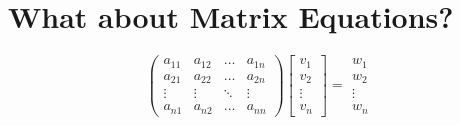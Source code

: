 \documentclass{article}  %
\begin{document}
\section{What about Matrix Equations?}   %
\begin{equation*}              %
\begin{pmatrix}                %
a_{11}&a_{12}&\dots&a_{1n}\\   %
a_{21}&a_{22}&\dots&a_{2n}\\   %
\vdots&\vdots&\ddots&\vdots\\  %
a_{n1}&a_{n2}&\dots&a_{nn}     %
\end{pmatrix}
\begin{bmatrix}                %
v_{1}\\                        %
v_{2}\\                        %
\vdots\\                       %
v_{n}                          %
\end{bmatrix}
=
\begin{matrix}                 %
w_{1}\\                        %
w_{2}\\                        %
\vdots\\                       %
w_{n}                          %
\end{matrix}
\end{equation*}
\end{document}
